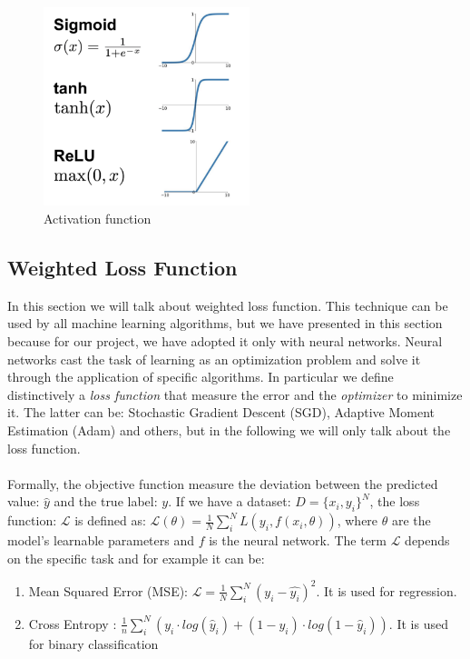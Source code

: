 \documentclass[LaM,binding=0.6cm]{sapthesis}
\begin{document}
\begin{figure}   \centering
    \includegraphics[width=60mm,scale=0.7]{actfun}
    \caption{Activation function }
    \label{fig:actfun}
\end{figure}
\subsection{Weighted Loss Function}
In this section we will talk about weighted loss function. This technique can be used by all machine learning algorithms, but we have presented in this section because for our project, we have adopted it only with neural networks. Neural networks cast the task of learning as an optimization problem and solve it through the application of specific algorithms. In particular we define distinctively a \textit{loss function} that measure the error and the \textit{optimizer} to minimize it. The latter can be: Stochastic Gradient Descent (SGD), Adaptive Moment Estimation (Adam) and others, but in the following we will only talk about the loss function.\\\\Formally, the objective function measure the deviation between the predicted value: $\hat{y}$ and the true label: $y$. If we have a dataset: $D=\{x_i,y_i\}^N$, the loss function: $\mathcal{L}$ is defined as: $\mathcal{L}(\theta)=\frac{1}{N}\sum_{i}^{N}L(y_i,f(x_i,\theta))$, where $\theta$ are the model's learnable parameters and $f$ is the neural network. The term $\mathcal{L}$ depends on the specific task and for example it can be:
\begin{enumerate}
\item Mean Squared Error (MSE): $\mathcal{L}=\frac{1}{N}\sum_{i}^{N}(y_i-\hat{y_i})^2$. It is used for regression.
\item Cross Entropy : $\frac{1}{n}\sum_{i}^{N}\left(y_i\cdot log(\hat{y}_i) + (1-y_i)\cdot log(1-\hat{y}_i)\right)$. It is used for binary classification
\end{enumerate}
\end{document}

